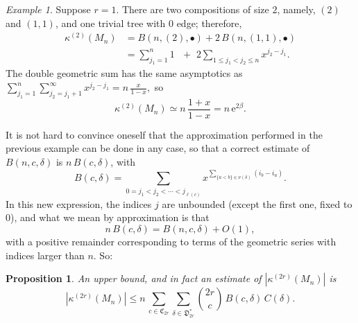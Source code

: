 \documentclass[12pt,a4paper,reqno]{amsart}
\newcommand{\E}{\mathrm{e}}
\newcommand{\cym}{\mathfrak{C}}
\newcommand{\dym}{\mathfrak{D}}
\newtheorem{proposition}[theorem]{Proposition}
\theoremstyle{remark}
\newtheorem*{example}{Example}
\begin{document}
\begin{example}
Suppose $r=1$. There are two compositions of size $2$, namely, $(2)$ and $(1,1)$, and one trivial tree with $0$ edge; therefore,
\begin{align*}
\kappa^{(2)}(M_n)&=B(n,(2),\bullet)+2\,B(n,(1,1),\bullet)\\ 
&=\sum_{ j_1 =1}^{ n} 1 \,\,\,\,+\,\,2\!\!\!\sum_{1\leq j_1<j_2 \leq n} x^{j_2-j_1}. \end{align*}
The double geometric sum has the same asymptotics as $\sum_{j_1 =1}^n\sum_{j_2=j_1+1}^\infty x^{j_2-j_1} = n\,\frac{x}{1-x},$
so $$\kappa^{(2)}(M_n) \simeq n\,\frac{1+x}{1-x} = n\,\E^{2\beta}.$$
\end{example}\bigskip

It is not hard to convince oneself that the approximation performed in the previous example can be done in any case, so that a correct estimate of $B(n,c,\delta)$ is $n\, B(c,\delta)$, with
$$B(c,\delta)=\sum_{0=j_1<j_2<\cdots<j_{\ell(c)}} x^{\sum_{\{a<b\}\in \nu(\delta)} (i_b-i_a)}.$$
In this new expression, the indices $j$ are unbounded (except the first one, fixed to $0$), and what we mean by approximation is that $$n\,B(c,\delta)= B(n,c,\delta)+O(1),$$ with a positive remainder corresponding to terms of the geometric series with indices larger than $n$. So:

\begin{proposition}\label{prop:firstestimate}
An upper bound, and in fact an estimate of $|\kappa^{(2r)}(M_n)|$ is
$$|\kappa^{(2r)}(M_n)|\leq n\,\sum_{c \in\cym_{2r}}\sum_{\delta \in \dym_{2r}^*} \binom{2r}{c}\,B(c,\delta)\,C(\delta).$$
\end{proposition}
\end{document}
